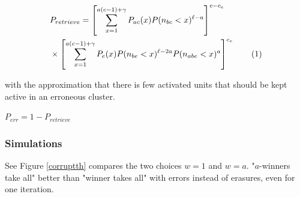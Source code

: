 \documentclass[english,10pt,twocolumn]{IEEEtran}
\newcommand\numberthis{\addtocounter{equation}{1}\tag{\theequation}}
\theoremstyle{definition}
\begin{document}
	
	
		\begin{align*}
	&P_{retrieve} = \left [ \sum_{x = 1}^{a(c-1) + \gamma} P_{ac}(x) P(n_{bc} < x)^{\ell-a} \right ]^{c - c_e}\\ 
	 &\times \left [ \sum_{x = 1}^{a(c-1) +\gamma} P_e(x) P(n_{be} < x)^{\ell-2a} P(n_{abe} < x)^a \right ]^{c_e} \numberthis \label{from_err_th}
	\end{align*}
	
	with the approximation that there is few activated units that should be kept active in an erroneous cluster.

	
	$P_{err} = 1 - P_{retrieve}$	

	
	
	\subsubsection{Simulations}
	See Figure \ref{corruptth} compares the two choices $w = 1$ and $w = a$.
	"$a$-winners take all" better than "winner takes all" with errors instead of erasures, even for one iteration.
	
\end{document}
